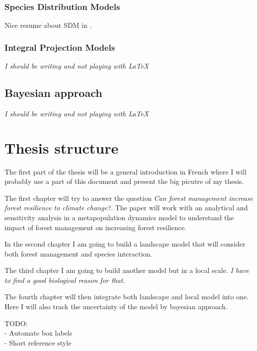 \subsubsection*{Species Distribution Models}\label{sdm}

Nice resume about SDM in \citet{Moran-Ordonez2016}.

\subsubsection*{Integral Projection Models}

\textit{I should be writing and not playing with \LaTeX}

\subsection*{Bayesian approach}

\textit{I should be writing and not playing with \LaTeX}

\section{Thesis structure}

The first part of the thesis will be a general introduction in French where  I will probably use a part of this document and present the big picutre of my thesis.

The first chapter will try to answer the question \textit{Can forest management increase forest resilience to climate change?}. The paper will work with an analytical and sensitivity analysis in a metapopulation dynamics model to understand the impact of forest management on increasing forest resilience.

In the second chapter I am going to build a landscape model that will consider both forest management and species interaction.

The third chapter I am going to build another model but in a local scale. \textit{I have to find a good biological reason for that}.

The fourth chapter will then integrate both landscape and local model into one. Here I will also track the uncertainty of the model by bayesian approach.


TODO: \\
- Automate box labels \\
- Short reference style \\




